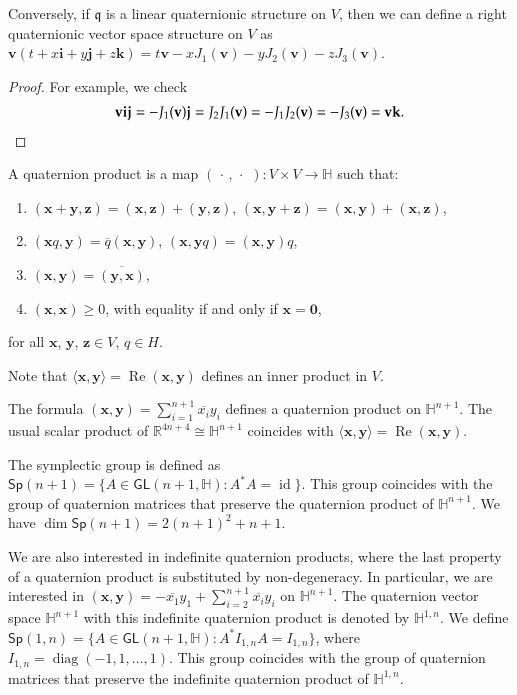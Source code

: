 \documentclass[12pt, a4paper,draft]{amsart}
\newcommand{\id}{\operatorname{id}}
\newcommand{\g}{\mathfrak}
\newcommand{\R}{\mathbb{R}}
\renewcommand{\H}{\mathbb{H}}
\renewcommand{\Re}{\operatorname{Re}}
\newcommand{\Sp}{\mathsf{Sp}}
\theoremstyle{remark}
\begin{document}
Conversely, if $\g{q}$ is a linear quaternionic structure on $V$, then we can define a right quaternionic vector space structure on $V$ as $\mathbf{v}(t+x\mathbf{i}+y\mathbf{j}+z\mathbf{k})=t\mathbf{v}-xJ_1(\mathbf{v})-yJ_2(\mathbf{v})-zJ_3(\mathbf{v})$.

\begin{proof}
For example, we check
\[
\begin{aligned}
\mathbf{v}\mathbf{i}\mathbf{j}
=-J_1(\mathbf{v})\mathbf{j}
=J_2 J_1(\mathbf{v})
=-J_1 J_2(\mathbf{v})
=-J_3(\mathbf{v})
=\mathbf{v}\mathbf{k}.
\end{aligned} \qedhere
\]
\end{proof}
\medskip

A quaternion product is a map $(\,\cdot\,,\,\cdot\,\,)\colon V\times V\to\H$ such that:
\begin{enumerate}
\item $(\mathbf{x}+\mathbf{y},\mathbf{z})
=(\mathbf{x},\mathbf{z})+(\mathbf{y},\mathbf{z})$,
$(\mathbf{x},\mathbf{y}+\mathbf{z})
=(\mathbf{x},\mathbf{y})+(\mathbf{x},\mathbf{z})$,
\item $(\mathbf{x}q,\mathbf{y})=\overline{q}(\mathbf{x},\mathbf{y})$, $(\mathbf{x},\mathbf{y}q)=(\mathbf{x},\mathbf{y}) q$,
\item $(\mathbf{x},\mathbf{y})=\overline{(\mathbf{y},\mathbf{x})}$,
\item $(\mathbf{x},\mathbf{x})\geq 0$, with equality if and only if $\mathbf{x}=\mathbf{0}$,
\end{enumerate}
for all $\mathbf{x}$, $\mathbf{y}$, $\mathbf{z}\in V$, $q\in H$.

Note that $\langle\mathbf{x},\mathbf{y}\rangle=\Re(\mathbf{x},\mathbf{y})$ defines an inner product in $V$.

The formula $(\mathbf{x},\mathbf{y})=\sum_{i=1}^{n+1} \overline{x_i}y_i$ defines a quaternion product on $\H^{n+1}$. The usual scalar product of $\R^{4n+4}\cong\H^{n+1}$ coincides with $\langle\mathbf{x},\mathbf{y}\rangle=\Re(\mathbf{x},\mathbf{y})$.

The symplectic group is defined as $\Sp(n+1)=\{A\in\mathsf{GL}(n+1,\H):A^* A=\id\}$.
This group coincides with the group of quaternion matrices that preserve the quaternion product of $\H^{n+1}$.	
We have $\dim\Sp(n+1)=2(n+1)^2+n+1$.

We are also interested in indefinite quaternion products, where the last property of a quaternion product is substituted by non-degeneracy.
In particular, we are interested in $(\mathbf{x},\mathbf{y})=-\overline{x_1}y_1+\sum_{i=2}^{n+1} \overline{x_i}y_i$ on $\H^{n+1}$.
The quaternion vector space $\H^{n+1}$ with this indefinite quaternion product is denoted by $\H^{1,n}$.
We define $\Sp(1,n)=\{A\in\mathsf{GL}(n+1,\H):A^*I_{1,n}A=I_{1,n}\}$, where $I_{1,n}=\operatorname{diag}(-1,1,\dots,1)$.
This group coincides with the group of quaternion matrices that preserve the indefinite quaternion product of $\H^{1,n}$.	
\end{document}
